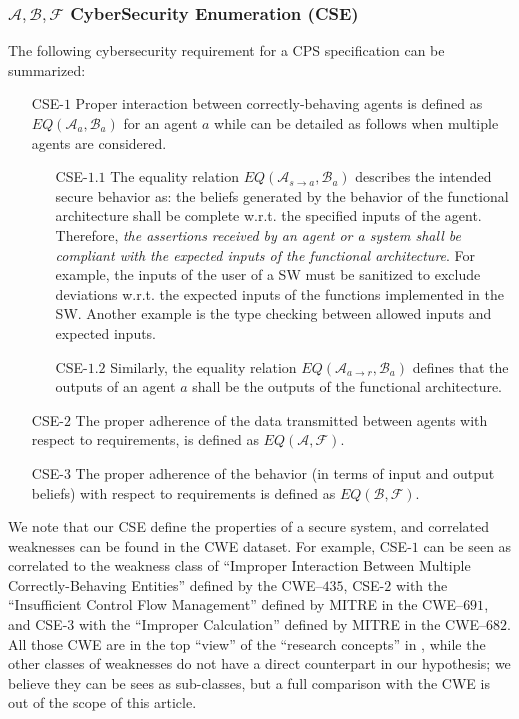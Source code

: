 \documentclass[conference]{IEEEtran}
\newcommand{\assertionRegion}{\mathcal{A}}
\newcommand{\beliefRegion}{\mathcal{B}}
\newcommand{\factRegion}{\mathcal{F}}
\newcommand{\abf}{\assertionRegion,\beliefRegion,\factRegion}
\newcommand{\eq}[2]{EQ(#1,#2)}
\begin{document}
\subsubsection{$\abf$ CyberSecurity Enumeration (CSE)} The following cybersecurity
requirement for a CPS specification can be summarized:
\begin{enumerate}
	\item[CSE-$1$] Proper interaction between correctly-behaving agents is
		defined as $\eq{\assertionRegion_a}{\beliefRegion_a}$ for an
		agent $a$ while can be detailed as follows when multiple agents
		are considered.
	\begin{enumerate}
		\item[CSE-$1.1$] The equality relation
			$\eq{\assertionRegion_{s\rightarrow
			a}}{\beliefRegion_a}$ describes the intended secure
			behavior as: the beliefs generated by the behavior of
			the functional architecture shall be complete w.r.t.
			the specified inputs of the agent. Therefore, \emph{the
			assertions received by an agent or a system shall be
			compliant with the expected inputs of the functional
			architecture}. For example, the inputs of the user of a
			SW must be sanitized to exclude deviations w.r.t. the
			expected inputs of the functions implemented in the SW.
			Another example is the type checking between allowed
			inputs and expected inputs.
		\item[CSE-$1.2$] Similarly, the equality relation
			$\eq{\assertionRegion_{a\rightarrow
			r}}{\beliefRegion_a}$ defines that the outputs of an
			agent $a$ shall be the outputs of the functional
			architecture.
	\end{enumerate}
\item[CSE-$2$] The proper adherence of the data transmitted between agents with respect to
	requirements, is defined as $\eq{\assertionRegion}{\factRegion}$. 
\item[CSE-$3$] The proper adherence of the behavior (in terms of input and output beliefs) with respect to
		requirements is defined as $\eq{\beliefRegion}{\factRegion}$.
\end{enumerate}

We note that our CSE define the properties of a secure system, and correlated
weaknesses can be found in the CWE dataset.  For example, CSE-$1$ can be seen as
correlated to the weakness class of ``Improper Interaction Between Multiple
Correctly-Behaving Entities'' defined by the CWE--$435$, CSE-$2$ with the
``Insufficient Control Flow Management'' defined by MITRE in the CWE--$691$,
and CSE-$3$ with the ``Improper Calculation'' defined by MITRE in the
CWE--$682$. All those CWE are in the top ``view'' of the ``research concepts''
in \autocite{MITRE2020CWEresearch}, while the other classes of weaknesses do not
have a direct counterpart in our hypothesis; we believe they can be sees as sub-classes,
but a full comparison with the CWE is out of the scope of this article.
\end{document}
